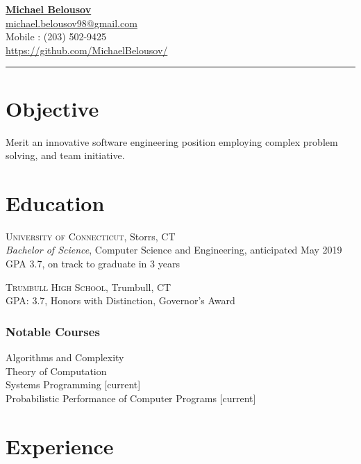 \documentclass[Letterpaper,11pt]{article}
\begin{document}
\setlength{\parindent}{0em}
\setlength{\parskip}{1em}
\setlength{\parsep}{1em}
\setlength{\itemsep}{0.2em}
\setlength{\headsep}{0.2em}
\setlength{\topskip}{0.2em}
\setlength{\topmargin}{0.2em}
\setlength{\topsep}{0.2em}
\setlength{\partopsep}{0.2em}
\setlength{\columnsep}{1em}

\addtolength{\topmargin}{-2em}

\textbf{\href{mailto:michael.belousov98@gmail.com}{\Large Michael Belousov}}\\
\href{mailto:michael.belousov98@gmail.com}{michael.belousov98@gmail.com}\\
Mobile : (203) 502-9425\\
\href{https://github.com/MichaelBelousov/}{https://github.com/MichaelBelousov/}\\
\hrule

\section*{Objective}

Merit an innovative software engineering position employing complex problem solving, and team initiative.

\section*{Education}

    \textsc{University of Connecticut}, Storrs, CT\\
    \textit{Bachelor of Science}, Computer Science and Engineering, anticipated May 2019\\
    GPA 3.7, on track to graduate in 3 years

    \textsc{Trumbull High School}, Trumbull, CT\\
    GPA: 3.7, Honors with Distinction, Governor's Award

    \subsubsection*{Notable Courses}
    Algorithms and Complexity\\
    Theory of Computation\\
    Systems Programming [current]\\
    Probabilistic Performance of Computer Programs [current]

\section*{Experience}
\end{document}
